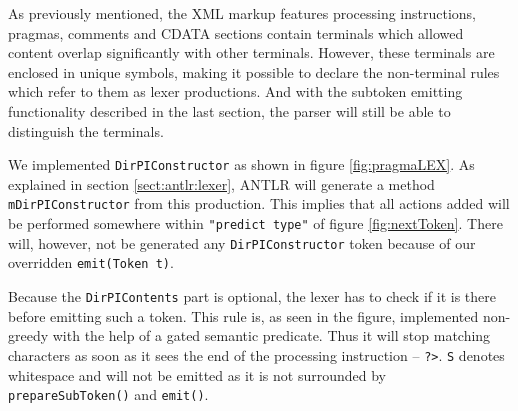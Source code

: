 As previously mentioned, the XML markup features processing instructions, pragmas, comments and CDATA sections contain terminals which allowed content overlap significantly with other terminals. However, these terminals are enclosed in unique symbols, making it possible to declare the non-terminal rules which refer to them as lexer productions. And with the subtoken emitting functionality described in the last section, the parser will still be able to distinguish the terminals. 

We implemented \verb!DirPIConstructor! as shown in figure \ref{fig:pragmaLEX}. As explained in section \ref{sect:antlr:lexer}, ANTLR will generate a method \verb!mDirPIConstructor! from this production. This implies that all actions added will be performed somewhere within \verb!"predict type"! of figure \ref{fig:nextToken}. There will, however, not be generated any \verb!DirPIConstructor! token because of our overridden \verb!emit(Token t)!.

Because the \verb!DirPIContents! part is optional, the lexer has to check if it is there before emitting such a token. This rule is, as seen in the figure, implemented non-greedy with the help of a gated semantic predicate. Thus it will stop matching characters as soon as it sees the end of the processing instruction -- \verb!?>!. \verb!S! denotes whitespace and will not be emitted as it is not surrounded by \verb!prepareSubToken()! and \verb!emit()!.

